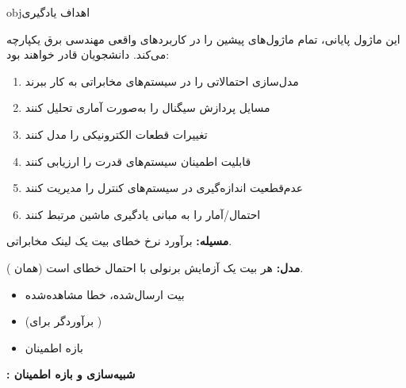 \begin{PSbox}[unbreakable]{obj}{اهداف یادگیری}

این ماژول پایانی، تمام ماژول‌های پیشین را در کاربردهای واقعی مهندسی برق یکپارچه می‌کند. دانشجویان قادر خواهند بود:

\begin{enumerate}
\def\labelenumi{\arabic{enumi}.}
\tightlist
\item
  مدل‌سازی احتمالاتی را در سیستم‌های مخابراتی به کار ببرند
\item
  مسایل پردازش سیگنال را به‌صورت آماری تحلیل کنند
\item
  تغییرات قطعات الکترونیکی را مدل کنند
\item
  قابلیت اطمینان سیستم‌های قدرت را ارزیابی کنند
\item
  عدم‌قطعیت اندازه‌گیری در سیستم‌های کنترل را مدیریت کنند
\item
  احتمال/آمار را به مبانی یادگیری ماشین مرتبط کنند
\end{enumerate}

\end{PSbox}



\textbf{مسیله:} برآورد نرخ خطای بیت یک لینک مخابراتی.

\textbf{مدل:} هر بیت یک آزمایش برنولی با احتمال خطای  است (همان ).

\begin{itemize}
\tightlist
\item
   بیت ارسال‌شده،  خطا مشاهده‌شده
\item
   (برآوردگر  برای )
\item
  بازه اطمینان 
\end{itemize}

\textbf{: شبیه‌سازی  و بازه اطمینان}


